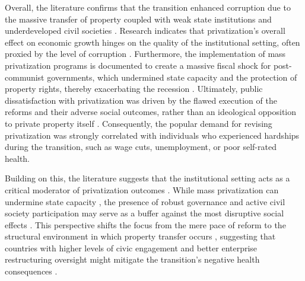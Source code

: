 \documentclass[12pt]{article}
\begin{document}
Overall, the literature confirms that the transition enhanced corruption due to the massive transfer of property coupled with weak state institutions 
and underdeveloped civil societies \citep{ Hoff2004, Stiglitz1999, Kaufmann1997}. Research indicates that privatization's overall effect on economic growth hinges on the quality of the 
institutional setting, often proxied by the level of corruption \citep{Cieslik2018}. Furthermore, the implementation of mass privatization programs is documented 
to create a massive fiscal shock for post-communist governments, which undermined state capacity and the protection of property rights, thereby exacerbating the recession 
\citep{Hamm2012}. Ultimately, public dissatisfaction with privatization was driven by the flawed execution of the reforms and their adverse social outcomes, rather than an 
ideological opposition to private property itself \citep{Denisova2012}. Consequently, the popular demand for revising privatization was strongly correlated with individuals 
who experienced hardships during the transition, such as wage cuts, unemployment, or poor self-rated health.

Building on this, the literature suggests that the institutional setting acts as a critical moderator of privatization outcomes \citep{Cieslik2018, Denisova2009}. 
While mass privatization can undermine state capacity \citep{Hamm2012}, the presence of robust governance and active civil society participation may 
serve as a buffer against the most disruptive social effects \citep{Stuckler2009, Cornia2014}. This perspective shifts the focus from the mere pace of 
reform to the structural environment in which property transfer occurs \citep{Roland2001}, suggesting that countries with higher levels of civic engagement 
and better enterprise restructuring oversight might mitigate the transition’s negative health consequences \citep{Stuckler2009, EBRD1999}.
\end{document}
